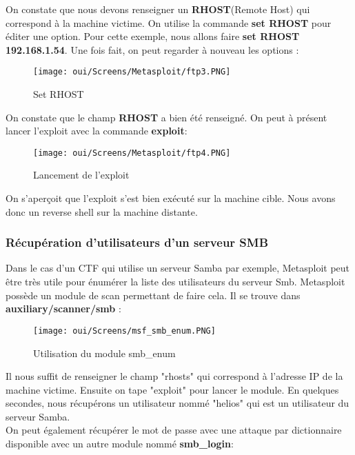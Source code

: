 On constate que nous devons renseigner un \textbf{RHOST}(Remote Host) qui correspond à la machine victime. On utilise la commande \textbf{set RHOST} pour éditer une option. Pour cette exemple, nous allons faire \textbf{set RHOST 192.168.1.54}. Une fois fait, on peut regarder à nouveau les options : 


\begin{figure}[htp!]
  \centering
  \setlength\figureheight{7cm}
  \setlength\figurewidth{9cm}
  \texttt{[image: oui/Screens/Metasploit/ftp3.PNG]}
  \caption{Set RHOST}
  \label{fig:courbe-tikz}
\end{figure}

On constate que le champ \textbf{RHOST} a bien été renseigné. On peut à présent lancer l'exploit avec la commande \textbf{exploit}:

\begin{figure}[htp!]
  \centering
  \setlength\figureheight{7cm}
  \setlength\figurewidth{9cm}
  \texttt{[image: oui/Screens/Metasploit/ftp4.PNG]}
  \caption{Lancement de l'exploit}
  \label{fig:courbe-tikz}
\end{figure}

On s'aperçoit que l'exploit s'est bien exécuté sur la machine cible. Nous avons donc un reverse shell sur la machine distante.

\subsubsection{Récupération d'utilisateurs d'un serveur SMB}
Dans le cas d'un CTF qui utilise un serveur Samba par exemple, Metasploit peut être très utile pour énumérer la liste des utilisateurs du serveur Smb. Metasploit possède un module de scan permettant de faire cela. Il se trouve dans \textbf{auxiliary/scanner/smb} :

\begin{figure}[htp!]
  \centering
  \setlength\figureheight{7cm}
  \setlength\figurewidth{9cm}
  \texttt{[image: oui/Screens/msf\_smb\_enum.PNG]}
  \caption{Utilisation du module smb\_enum}
  \label{fig:courbe-tikz}
\end{figure}

Il nous suffit de renseigner le champ "rhosts" qui correspond à l'adresse IP de la machine victime. Ensuite on tape "exploit" pour lancer le module. En quelques secondes, nous récupérons un utilisateur nommé "helios" qui est un utilisateur du serveur Samba.\\
On peut également récupérer le mot de passe avec une attaque par dictionnaire disponible avec un autre module nommé \textbf{smb\_login}:

